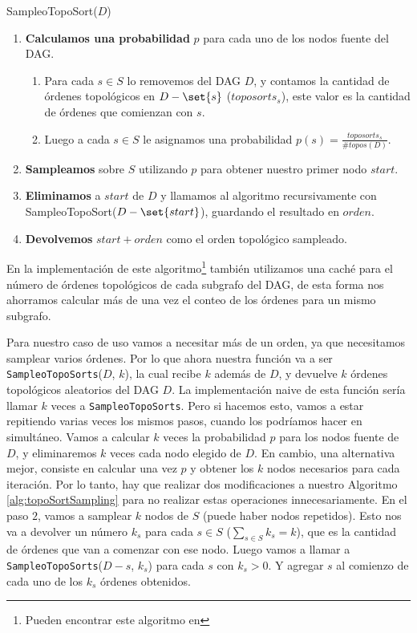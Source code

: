 \begin{algorithm}
\caption{SampleoTopoSort($D$)} \label{alg:topoSortSampling}
\begin{enumerate}
    \item \textbf{Calculamos una probabilidad} $p$ para cada uno de los nodos fuente del DAG.
        \begin{enumerate}
            \item Para cada $s \in S$ lo removemos del DAG $D$, y contamos la cantidad de órdenes topológicos en $D-\set{s}$ ($toposorts_s$), este valor es la cantidad de órdenes que comienzan con $s$.
            \item Luego a cada $s \in S$ le asignamos una probabilidad $p(s)= \frac{toposorts_s}{\#topos(D)}$. 
        \end{enumerate}
    \item \textbf{Sampleamos} sobre $S$ utilizando $p$ para obtener nuestro primer nodo $start$.
    \item \textbf{Eliminamos} a $start$ de $D$ y llamamos al algoritmo recursivamente con  SampleoTopoSort($D-\set{start}$), guardando el resultado en $orden$. 
    \item \textbf{Devolvemos} $start + orden$ como el orden topológico sampleado. 
\end{enumerate}
\end{algorithm}


En la implementación de este algoritmo\footnote{Pueden encontrar este algoritmo en } también utilizamos una caché para el número de órdenes topológicos de cada subgrafo del DAG, de esta forma nos ahorramos calcular más de una vez el conteo de los órdenes para un mismo subgrafo.

Para nuestro caso de uso vamos a necesitar más de un orden, ya que necesitamos samplear varios órdenes. Por lo que ahora nuestra función va a ser \texttt{SampleoTopoSorts}($D$, $k$), la cual recibe $k$ además de $D$, y devuelve $k$ órdenes topológicos aleatorios del DAG $D$. La implementación naive de esta función sería llamar $k$ veces a \texttt{SampleoTopoSorts}. Pero si hacemos esto, vamos a estar repitiendo varias veces los mismos pasos, cuando los podríamos hacer en simultáneo. Vamos a calcular $k$ veces la probabilidad $p$ para los nodos fuente de $D$, y eliminaremos $k$ veces cada nodo elegido de $D$. En cambio, una alternativa mejor, consiste en calcular una vez $p$ y obtener los $k$ nodos necesarios para cada iteración. 
Por lo tanto, hay que realizar dos modificaciones a nuestro Algoritmo \ref{alg:topoSortSampling} para no realizar estas operaciones innecesariamente. En  el paso $2$, vamos a samplear $k$ nodos de $S$ (puede haber nodos repetidos). Esto nos va a devolver un número $k_s$ para cada $s \in S$ ($\sum_{s \in S} k_s = k$), que es la cantidad de órdenes que van a comenzar con ese nodo. Luego vamos a llamar a \texttt{SampleoTopoSorts}($D-{s}$, $k_s$) para cada $s$ con $k_s > 0$. Y agregar $s$ al comienzo de cada uno de los $k_s$ órdenes obtenidos. 

